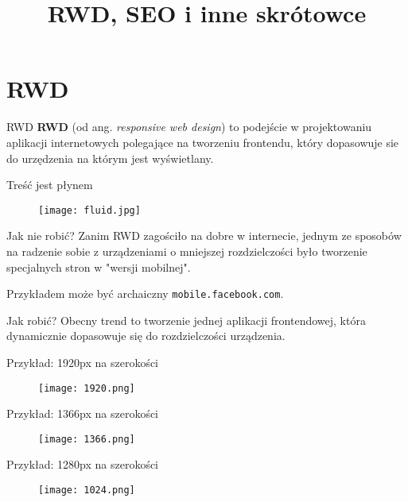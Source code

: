 

\title{RWD, SEO i inne skrótowce}



\section{RWD}

\begin{frame}{RWD}	
	\textbf{RWD} (od ang. \emph{responsive web design}) to podejście w projektowaniu aplikacji internetowych polegające na tworzeniu frontendu, który dopasowuje sie do urzędzenia na którym jest wyświetlany.
\end{frame}

\begin{frame}{Treść jest płynem}
	\begin{figure}[t]
		\centering
		\texttt{[image: fluid.jpg]}
	\end{figure}
\end{frame}

\begin{frame}{Jak nie robić?}	
	Zanim RWD zagościło na dobre w internecie, jednym ze sposobów na radzenie sobie z urządzeniami o mniejszej rozdzielczości było tworzenie specjalnych stron w "wersji mobilnej".
	
	Przykładem może być archaiczny \texttt{mobile.facebook.com}.
\end{frame}

\begin{frame}{Jak robić?}	
	Obecny trend to tworzenie jednej aplikacji frontendowej, która dynamicznie dopasowuje się do rozdzielczości urządzenia.
\end{frame}

\begin{frame}{Przykład: 1920px na szerokości}
	\begin{figure}[t]
		\centering
		\texttt{[image: 1920.png]}
	\end{figure}
\end{frame}

\begin{frame}{Przykład: 1366px na szerokości}
	\begin{figure}[t]
		\centering
		\texttt{[image: 1366.png]}
	\end{figure}
\end{frame}

\begin{frame}{Przykład: 1280px na szerokości}
	\begin{figure}[t]
		\centering
		\texttt{[image: 1024.png]}
	\end{figure}
\end{frame}

